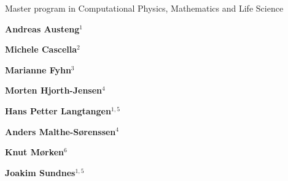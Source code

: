 \documentclass[%
oneside,                 %
final,                   %
10pt]{article}
\begin{document}






\thispagestyle{empty}

\begin{center}
{\LARGE\bf
\begin{spacing}{1.25}
Master program in Computational Physics, Mathematics and Life Science
\end{spacing}
}
\end{center}


\begin{center}
{\bf Andreas Austeng${}^{1}$} \\ [0mm]
\end{center}


\begin{center}
{\bf Michele Cascella${}^{2}$} \\ [0mm]
\end{center}


\begin{center}
{\bf Marianne Fyhn${}^{3}$} \\ [0mm]
\end{center}


\begin{center}
{\bf Morten Hjorth-Jensen${}^{4}$} \\ [0mm]
\end{center}


\begin{center}
{\bf Hans Petter Langtangen${}^{1, 5}$} \\ [0mm]
\end{center}


\begin{center}
{\bf Anders Malthe-Sørenssen${}^{4}$} \\ [0mm]
\end{center}


\begin{center}
{\bf Knut Mørken${}^{6}$} \\ [0mm]
\end{center}


\begin{center}
{\bf Joakim Sundnes${}^{1, 5}$} \\ [0mm]
\end{center}
\end{document}

